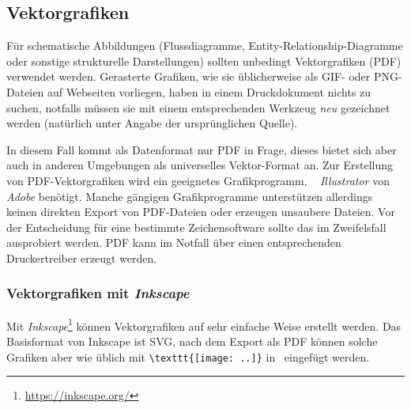 \subsection{Vektorgrafiken}

Für schematische Abbildungen (\zB Flussdiagramme, Entity-Relationship-Diagramme
oder sonstige strukturelle Darstellungen) sollten unbedingt
Vektorgrafiken (PDF) verwendet werden. %
Gerasterte Grafiken, wie sie üblicherweise als GIF- oder PNG-Dateien
auf Webseiten vorliegen, haben in einem Druckdokument nichts zu suchen, notfalls
müssen sie mit einem entsprechenden Werkzeug \emph{neu} gezeichnet werden (natürlich
unter Angabe der ursprünglichen Quelle).

In diesem Fall kommt als Datenformat nur PDF %
in Frage,
dieses bietet sich aber auch in anderen Umgebungen als universelles
Vektor-Format an.
Zur Erstellung von PDF-Vektorgrafiken wird ein geeignetes
Grafikprogramm, \zB\ %
\emph{Illustrator} von \emph{Adobe} benötigt.
Manche gängigen Grafikprogramme 
unterstützen allerdings keinen direkten Export von PDF-Dateien
oder erzeugen unsaubere Dateien. Vor der Entscheidung
für eine bestimmte Zeichensoftware sollte das im Zweifelsfall
ausprobiert werden.
PDF kann im Notfall über einen entsprechenden Druckertreiber erzeugt werden.


\subsubsection{Vektorgrafiken mit \emph{Inkscape}}
\label{sec:InkscapeGraphics}

Mit \emph{Inkscape}\footnote{\url{https://inkscape.org/}} können Vektorgrafiken auf
sehr einfache Weise erstellt werden.
Das Basisformat von Inkscape ist SVG,
nach dem Export als PDF können solche Grafiken aber wie üblich mit
\verb!\texttt{[image: ..]}! in \latex\ eingefügt werden.

